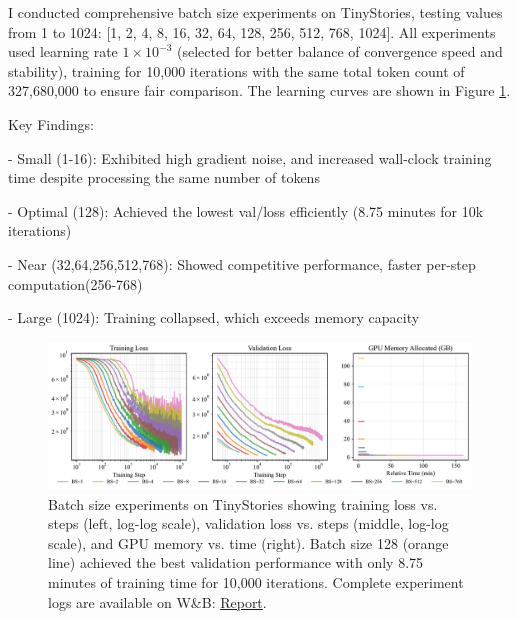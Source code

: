 \begin{answer}
I conducted comprehensive batch size experiments on TinyStories, testing values from 1 to 1024: [1, 2, 4, 8, 16, 32, 64, 128, 256, 512, 768, 1024]. All experiments used learning rate $1 \times 10^{-3}$ (selected for better balance of convergence speed and stability), training for 10,000 iterations with the same total token count of 327,680,000 to ensure fair comparison. The learning curves are shown in Figure \ref{fig:batch_size_experiments}.

Key Findings:

- {Small (1-16)}: Exhibited high gradient noise, and increased wall-clock training time despite processing the same number of tokens

- {Optimal (128)}: Achieved the lowest val/loss efficiently (8.75 minutes for 10k iterations)

- {Near (32,64,256,512,768)}: Showed competitive performance, faster per-step computation(256-768)

- {Large (1024)}: Training collapsed, which exceeds memory capacity

\begin{figure}[h]
    \centering
    \includegraphics[width=\textwidth]{images/batch_size_experiments.pdf}
    \caption{Batch size experiments on TinyStories showing training loss vs. steps (left, log-log scale), validation loss vs. steps (middle, log-log scale), and GPU memory vs. time (right). Batch size 128 (orange line) achieved the best validation performance with only 8.75 minutes of training time for 10,000 iterations. Complete experiment logs are available on W\&B: \href{https://wandb.ai/donglinkang2021-beijing-institute-of-technology/cs336-assignment1-basics/reports/Batch-size-variations--VmlldzoxNDY5Mzc1OQ?accessToken=5hohvd95f5ejp1e2cn3wt8x2ysqrkgmou352yx2axyiu3ho2fibb3g1bugj39zdx}{Report}.}
    \label{fig:batch_size_experiments}
\end{figure}

\end{answer}

